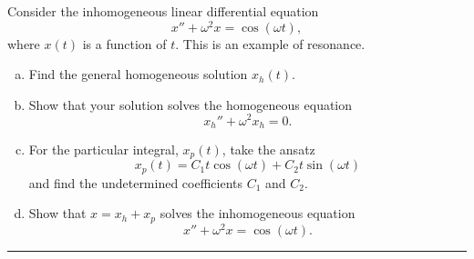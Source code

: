 \documentclass[12pt]{amsbook}
\begin{document}
\newpage
\begin{problem}
Consider the inhomogeneous linear differential equation
\[
x''+\omega^2x=\cos(\omega t),
\]
where $x(t)$ is a function of $t$. This is an example of resonance.
\begin{enumerate}[(a)]
    \item Find the general homogeneous solution $x_h(t)$.
    \item Show that your solution solves the homogeneous equation
    \[
    x_h''+\omega^2x_h=0.
    \]
    \item For the particular integral, $x_p(t)$, take the ansatz
    \[
    x_p(t)=C_1t\cos(\omega t) + C_2 t\sin(\omega t)
    \]
    and find the undetermined coefficients $C_1$ and $C_2$.
    \item Show that $x=x_h+x_p$ solves the inhomogeneous equation
    \[
    x''+\omega^2 x = \cos(\omega t).
    \]
\end{enumerate}
\end{problem}
\hrule
\end{document}
